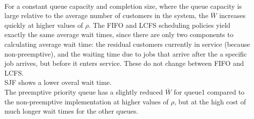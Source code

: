 \documentclass{article}
\begin{document}
{
\\
For a constant queue capacity and completion size, where the queue capacity is large relative to the average number of customers in the system, the $\overline{W}$  increases quickly at higher values of $\rho$. The FIFO and LCFS scheduling policies yield exactly the same average wait times, since there are only two components to calculating average wait time: the residual customers currently in service (because non-preemptive), and the waiting time due to jobs that arrive after the a specific job arrives, but before it enters service. These do not change between FIFO and LCFS.\\
SJF shows a lower overal wait time.\\
The preemptive priority queue has a slightly reduced $\overline{W}$ for queue1 compared to the non-preemptive implementation at higher values of $\rho$, but at the high cost of much longer wait times for the other queues.
}
\bigskip
\newpage


\end{document}
